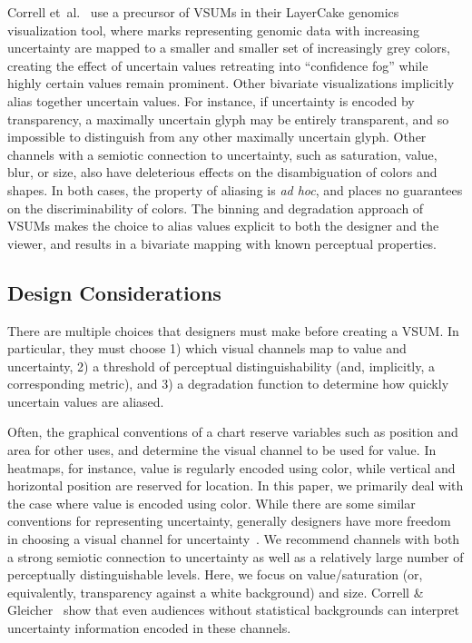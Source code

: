 \documentclass{vgtc}                          %
\newcommand{\ea}{{et~al.}\xspace}
\begin{document}
Correll \ea~\cite{correll2015layercake,correll2011visualizing} use a precursor of VSUMs in their LayerCake genomics visualization tool, where marks representing genomic data with increasing uncertainty are mapped to a smaller and smaller set of increasingly grey colors, creating the effect of uncertain values retreating into ``confidence fog'' while highly certain values remain prominent. Other bivariate visualizations implicitly alias together uncertain values. For instance, if uncertainty is encoded by transparency, a maximally uncertain glyph may be entirely transparent, and so impossible to distinguish from any other maximally uncertain glyph. Other channels with a semiotic connection to uncertainty, such as saturation, value, blur, or size, also have deleterious effects on the disambiguation of colors and shapes. In both cases, the property of aliasing is \emph{ad hoc}, and places no guarantees on the discriminability of colors. The binning and degradation approach of VSUMs makes the choice to alias values explicit to both the designer and the viewer, and results in a bivariate mapping with known perceptual properties.

\subsection{Design Considerations}

\performanceFig

There are multiple choices that designers must make before creating a VSUM. In particular, they must choose 1) which visual channels map to value and uncertainty, 2) a threshold of perceptual distinguishability (and, implicitly, a corresponding metric), and 3) a degradation function to determine how quickly uncertain values are aliased.

Often, the graphical conventions of a chart reserve variables such as position and area for other uses, and determine the visual channel to be used for value. In heatmaps, for instance, value is regularly encoded using color, while vertical and horizontal position are reserved for location. In this paper, we primarily deal with the case where value is encoded using color. While there are some similar conventions for representing uncertainty, generally designers have more freedom in choosing a visual channel for uncertainty~\cite{maceachren1992visualizing}. We recommend channels with both a strong semiotic connection to uncertainty as well as a relatively large number of perceptually distinguishable levels. Here, we focus on value/saturation (or, equivalently, transparency against a white background) and size. Correll \& Gleicher~\cite{correll2013error} show that even audiences without statistical backgrounds can interpret uncertainty information encoded in these channels.
\end{document}
